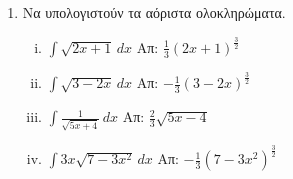 


\pagestyle{askhseis}
\everymath{\displaystyle}




\begin{center}
  \minibox{{\large\bfseries \textcolor{Col1}{Ασκήσεις στα Αόριστα Ολοκληρώματα}}}
\end{center}
\vspace{\baselineskip}

\begin{enumerate}
  \item Να υπολογιστούν τα αόριστα ολοκληρώματα.
    \begin{enumerate}[i)]
      \item $ \int \sqrt{ 2x+1 } \,{dx} $ 
        \hfill Απ: $ \frac{ 1 }{ 3 } (2x+1)^{\frac{ 3 }{ 2 } } $
      \item $ \int \sqrt{ 3-2x } \,{dx} $ 
        \hfill Απ: $ - \frac{ 1}{ 3 }(3-2x)^{\frac{ 3 }{ 2 }}  $
      \item $ \int \frac{1}{ \sqrt{ 5x+4 } } \,{dx} $ 
        \hfill Απ: $ \frac{ 2 }{ 3 } \sqrt{ 5x-4 } $
      \item $ \int 3x \sqrt{ 7-3x^{2} } \,{dx} $ 
        \hfill Απ: $ - \frac{1}{ 3 } (7-3x^{2})^{\frac{ 3 }{ 2 }} $
    \end{enumerate}


\end{enumerate}
